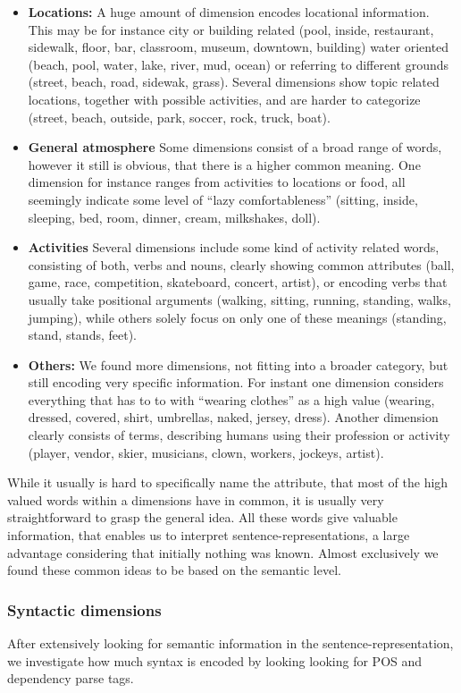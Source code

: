 \begin{itemize}
\item \textbf{Locations:} A huge amount of dimension encodes locational information. This may be for instance city or building related (pool, inside, restaurant, sidewalk, floor, bar, classroom, museum, downtown, building) water oriented (beach, pool, water, lake, river, mud, ocean) or referring to different grounds (street, beach, road, sidewak, grass). Several dimensions show topic related locations, together with possible activities, and are harder to categorize (street, beach, outside, park, soccer, rock, truck, boat).
\item \textbf{General atmosphere} Some dimensions consist of a broad range of words, however it still is obvious, that there is a higher common meaning.  One dimension for instance ranges from activities to locations or food, all seemingly indicate some level of ``lazy comfortableness'' (sitting, inside, sleeping, bed, room, dinner, cream, milkshakes, doll).
\item \textbf{Activities} Several dimensions include some kind of activity related words, consisting of both, verbs and nouns, clearly showing common attributes (ball, game, race, competition, skateboard, concert, artist), or encoding verbs that usually take positional arguments (walking, sitting, running, standing, walks, jumping), while others solely focus on only one of these meanings (standing, stand, stands, feet).
\item \textbf{Others:} We found more dimensions, not fitting into a broader category, but still encoding very specific information. For instant one dimension considers everything that has to to with ``wearing clothes'' as a high value (wearing, dressed, covered, shirt, umbrellas, naked, jersey, dress). Another dimension clearly consists of terms, describing humans using their profession or activity (player, vendor, skier, musicians, clown, workers, jockeys, artist).
\end{itemize}

\noindent
While it usually is hard to specifically name the attribute, that most of the high valued words within a dimensions have in common, it is usually very straightforward to grasp the general idea. All these words give valuable information, that enables us to interpret sentence-representations, a large advantage considering that initially nothing was known. Almost exclusively we found these common ideas to be based on the semantic level.

\subsubsection{Syntactic dimensions}
After extensively looking for semantic information in the sentence-representation, we investigate how much syntax is encoded by looking looking for \ac{POS} and dependency parse tags.

